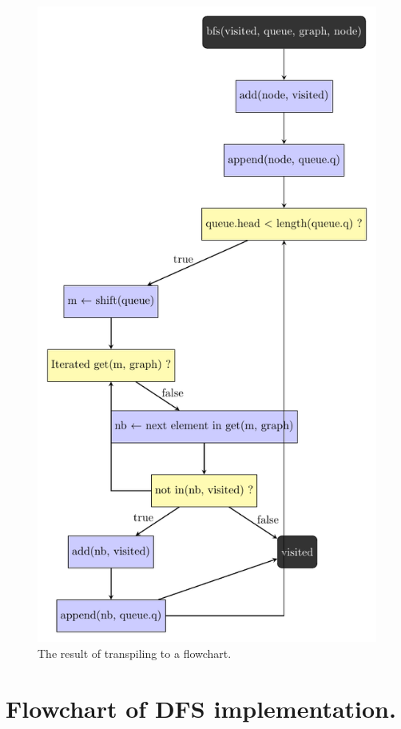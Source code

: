 \begin{figure}[ht!]
    \centering
    \includegraphics[scale=.6]{assets/chapter6/graph/BFS_ibp.pdf}
    \caption{The result of transpiling  to a flowchart.}
    \label{bfsIBP}
\end{figure}

\section{Flowchart of DFS implementation.}
\label{Flowchart of DFS implementation.}

